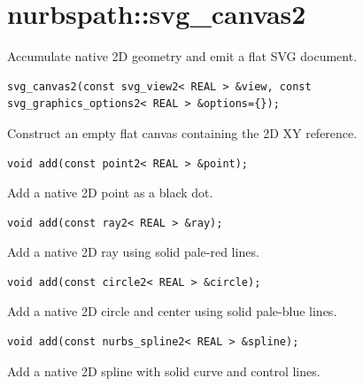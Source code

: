 \section{nurbspath::svg\_canvas2}
Accumulate native 2D geometry and emit a flat SVG document.
\par\noindent\begin{minipage}{\linewidth}
\begin{lstlisting}[style=apireference]
svg_canvas2(const svg_view2< REAL > &view, const svg_graphics_options2< REAL > &options={});
\end{lstlisting}
{\footnotesize Construct an empty flat canvas containing the 2D XY reference.\par}
\end{minipage}\par\vspace{1pt}
\par\noindent\begin{minipage}{\linewidth}
\begin{lstlisting}[style=apireference]
void add(const point2< REAL > &point);
\end{lstlisting}
{\footnotesize Add a native 2D point as a black dot.\par}
\end{minipage}\par\vspace{1pt}
\par\noindent\begin{minipage}{\linewidth}
\begin{lstlisting}[style=apireference]
void add(const ray2< REAL > &ray);
\end{lstlisting}
{\footnotesize Add a native 2D ray using solid pale-red lines.\par}
\end{minipage}\par\vspace{1pt}
\par\noindent\begin{minipage}{\linewidth}
\begin{lstlisting}[style=apireference]
void add(const circle2< REAL > &circle);
\end{lstlisting}
{\footnotesize Add a native 2D circle and center using solid pale-blue lines.\par}
\end{minipage}\par\vspace{1pt}
\par\noindent\begin{minipage}{\linewidth}
\begin{lstlisting}[style=apireference]
void add(const nurbs_spline2< REAL > &spline);
\end{lstlisting}
{\footnotesize Add a native 2D spline with solid curve and control lines.\par}
\end{minipage}\par\vspace{1pt}
